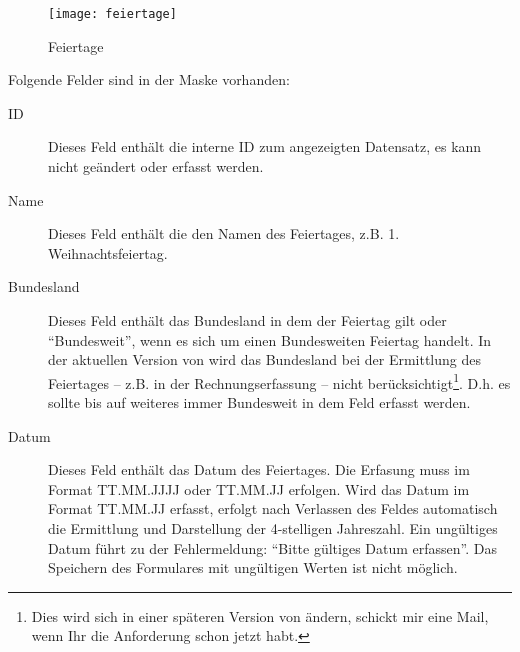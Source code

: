 \begin{figure}[ht]
\centering
\texttt{[image: feiertage]}
\caption{Feiertage\label{feiertage:fig}}
\end{figure}

Folgende Felder sind in der Maske vorhanden:
\begin{description}
\item[ID] 
Dieses Feld enthält die interne ID zum angezeigten Datensatz, es
kann nicht geändert oder erfasst werden.
\item[Name] 
Dieses Feld enthält die den Namen des Feiertages, z.B.
1. Weihnachtsfeiertag.
\item[Bundesland] 
Dieses Feld enthält das Bundesland in dem der Feiertag
gilt oder ``Bundesweit'', wenn es sich um einen Bundesweiten Feiertag
handelt. In der aktuellen Version von \tinyHeb\/ wird das Bundesland
bei der Ermittlung des Feiertages -- z.B. in der Rechnungserfassung -- 
nicht berücksichtigt\footnote{Dies wird sich in einer späteren
Version von \tinyHeb\/ ändern, schickt mir eine Mail, wenn Ihr die
Anforderung schon jetzt habt.}. D.h. es sollte bis auf weiteres immer
Bundesweit in dem Feld erfasst werden.
\item[Datum] 
Dieses Feld enthält das Datum des Feiertages. Die Erfasung muss im Format
TT.MM.JJJJ oder TT.MM.JJ erfolgen. Wird das Datum im Format TT.MM.JJ 
erfasst, erfolgt nach Verlassen des Feldes automatisch die Ermittlung
und Darstellung der 4-stelligen Jahreszahl. Ein ungültiges Datum führt
zu der Fehlermeldung: ``Bitte gültiges Datum erfassen''. Das Speichern
des Formulares mit ungültigen Werten ist nicht möglich.
\end{description}

